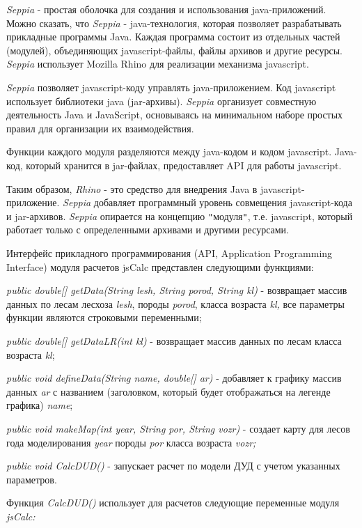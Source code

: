 \documentclass{article}
\begin{document}
\textit{Seppia} - простая оболочка для создания и использования 
java-приложений. Можно сказать, что \textit{Seppia} - 
java-технология, которая позволяет разрабатывать 
прикладные программы Java.  Каждая программа 
состоит из отдельных частей (модулей), объединяющих 
javascript-файлы, файлы архивов и другие ресурсы. 
\textit{Seppia} использует Mozilla Rhino для реализации 
 механизма javascript. 

\textit{Seppia} позволяет javascript-коду управлять java-приложением. 
Код javascript использует библиотеки java (jar-архивы). 
\textit{Seppia} организует совместную деятельность 
Java и JavaScript, основываясь на минимальном наборе 
простых правил для организации их взаимодействия. 

Функции каждого модуля разделяются между java-кодом 
и кодом javascript. Java-код, который хранится в jar-файлах, 
предоставляет API для работы javascript. 

Таким образом, \textit{Rhino} - это средство для внедрения 
Java в javascript- приложение. \textit{Seppia} добавляет программный 
уровень совмещения javascript-кода и jar-архивов. 
 \textit{Seppia} опирается на концепцию \texttt{"}модуля\texttt{"}, 
т.е. javascript, который работает только с определенными 
архивами и другими ресурсами. 

Интерфейс прикладного программирования (API, 
Application Programming Interface) модуля расчетов jsCalc представлен 
следующими функциями:

\textit{public double[] getData(String lesh, String porod, String kl)} - возвращает 
массив данных по лесам лесхоза \textit{lesh}, породы 
\textit{porod}, класса возраста \textit{kl,} все параметры 
функции являются строковыми переменными;

\textit{public double[] getDataLR(int kl)} - возвращает массив 
данных по лесам класса возраста \textit{kl};

\textit{public void defineData(String name, double[] ar)} - добавляет 
к графику массив данных \textit{ar} с названием (заголовком, 
который будет отображаться на легенде графика) 
\textit{name};

\textit{public void makeMap(int year, String por, String vozr)} - создает 
карту для лесов года моделирования \textit{year }породы\textit{ 
 por }класса возраста\textit{  vozr;}

\textit{public void CalcDUD()} - запускает расчет по модели 
ДУД с учетом указанных параметров.

Функция \textit{CalcDUD() }использует для расчетов 
следующие переменные модуля \textit{jsCalc:}
\end{document}
